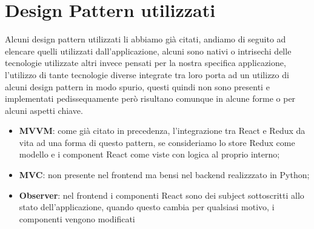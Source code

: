 \section{Design Pattern utilizzati}
Alcuni design pattern utilizzati li abbiamo già citati, andiamo di seguito ad elencare quelli utilizzati dall'applicazione, alcuni sono nativi o intrisechi delle tecnologie utilizzate
altri invece pensati per la nostra specifica applicazione, l'utilizzo di tante tecnologie diverse integrate tra loro porta ad un utilizzo di alcuni design pattern in modo spurio,
questi quindi non sono presenti e implementati pedissequamente però risultano comunque in alcune forme o per alcuni aspetti chiave.
\begin{itemize}
  \item \textbf{MVVM}: come già citato in precedenza, l'integrazione tra React e Redux da vita ad una forma di questo pattern, se consideriamo lo store Redux come modello e i
        component React come viste con logica al proprio interno;
  \item \textbf{MVC}: non presente nel frontend ma bensi nel backend realizzzato in Python;
  \item \textbf{Observer}: nel frontend i componenti React sono dei subject sottoscritti allo stato dell'applicazione, quando questo cambia per qualsiasi motivo, i componenti
        vengono modificati
\end{itemize}

